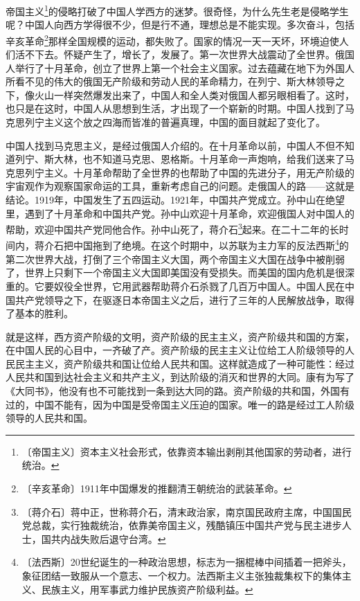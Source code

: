 \documentclass[12pt,UTF-8,openany]{ctexbook}
\begin{document}
\begin{large}
    帝国主义\footnote{〔帝国主义〕资本主义社会形式，依靠资本输出剥削其他国家的劳动者，进行统治。}的侵略打破了中国人学西方的迷梦。很奇怪，为什么先生老是侵略学生呢？中国人向西方学得很不少，但是行不通，理想总是不能实现。多次奋斗，包括辛亥革命\footnote{〔辛亥革命〕1911年中国爆发的推翻清王朝统治的武装革命。}那样全国规模的运动，都失败了。国家的情况一天一天坏，环境迫使人们活不下去。怀疑产生了，增长了，发展了。第一次世界大战震动了全世界。俄国人举行了十月革命，创立了世界上第一个社会主义国家。过去蕴藏在地下为外国人所看不见的伟大的俄国无产阶级和劳动人民的革命精力，在列宁、斯大林领导之下，像火山一样突然爆发出来了，中国人和全人类对俄国人都另眼相看了。这时，也只是在这时，中国人从思想到生活，才出现了一个崭新的时期。中国人找到了马克思列宁主义这个放之四海而皆准的普遍真理，中国的面目就起了变化了。
    
    中国人找到马克思主义，是经过俄国人介绍的。在十月革命以前，中国人不但不知道列宁、斯大林，也不知道马克思、恩格斯。十月革命一声炮响，给我们送来了马克思列宁主义。十月革命帮助了全世界的也帮助了中国的先进分子，用无产阶级的宇宙观作为观察国家命运的工具，重新考虑自己的问题。走俄国人的路——这就是结论。1919年，中国发生了五四运动。1921年，中国共产党成立。孙中山在绝望里，遇到了十月革命和中国共产党。孙中山欢迎十月革命，欢迎俄国人对中国人的帮助，欢迎中国共产党同他合作。孙中山死了，蒋介石\footnote{〔蒋介石〕蒋中正，世称蒋介石，清末政治家，南京国民政府主席，中国国民党总裁，实行独裁统治，依靠美帝国主义，残酷镇压中国共产党与民主进步人士，国共内战失败后退守台湾。}起来。在二十二年的长时间内，蒋介石把中国拖到了绝境。在这个时期中，以苏联为主力军的反法西斯\footnote{〔法西斯〕20世纪诞生的一种政治思想，标志为一捆棍棒中间插着一把斧头，象征团结一致服从一个意志、一个权力。法西斯主义主张独裁集权下的集体主义、民族主义，用军事武力维护民族资产阶级利益。}的第二次世界大战，打倒了三个帝国主义大国，两个帝国主义大国在战争中被削弱了，世界上只剩下一个帝国主义大国即美国没有受损失。而美国的国内危机是很深重的。它要奴役全世界，它用武器帮助蒋介石杀戮了几百万中国人。中国人民在中国共产党领导之下，在驱逐日本帝国主义之后，进行了三年的人民解放战争，取得了基本的胜利。
    
    就是这样，西方资产阶级的文明，资产阶级的民主主义，资产阶级共和国的方案，在中国人民的心目中，一齐破了产。资产阶级的民主主义让位给工人阶级领导的人民民主主义，资产阶级共和国让位给人民共和国。这样就造成了一种可能性：经过人民共和国到达社会主义和共产主义，到达阶级的消灭和世界的大同。康有为写了《大同书》，他没有也不可能找到一条到达大同的路。资产阶级的共和国，外国有过的，中国不能有，因为中国是受帝国主义压迫的国家。唯一的路是经过工人阶级领导的人民共和国。
    
\end{large}
\end{document}
